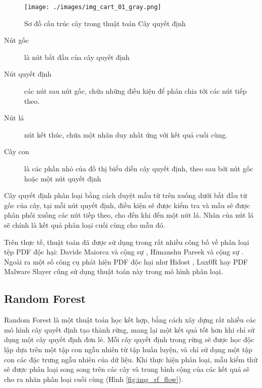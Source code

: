 \documentclass[./../main.tex]{subfiles}
\begin{document}
\begin{figure}[ht!]
	\centering
	\texttt{[image: ./images/img\_cart\_01\_gray.png]}
	\caption{Sơ đồ cấu trúc cây trong thuật toán Cây quyết định}
	\label{fig:img_cart_01_gray}
\end{figure}

\begin{description}
	\item[Nút gốc] là nút bắt đầu của cây quyết định
	\item[Nút quyết định] các nút sau nút gốc, chứa những điều kiện để phân chia tới các nút tiếp theo.
	\item[Nút lá] nút kết thúc, chứa một nhãn duy nhất ứng với kết quả cuối cùng.
	\item[Cây con] là các phần nhỏ của đồ thị biểu diễn cây quyết định, theo sau bởi nút gốc hoặc một nút quyết định
\end{description}

Cây quyết định phân loại bằng cách duyệt mẫu từ trên xuống dưới bắt đầu từ gốc của cây, tại mỗi nút quyết định, điều kiện sẽ được kiểm tra và mẫu sẽ được phân phối xuống các nút tiếp theo, cho đến khi đến một nút lá. Nhãn của nút lá sẽ chính là kết quả phân loại cuối cùng cho mẫu đó.

Trên thực tế, thuật toán đã được sử dụng trong rất nhiều công bố về phân loại tệp PDF độc hại: Davide Maiorca và cộng sự \cite{davide}, Himanshu Pareek và cộng sự \cite{himanshu}. Ngoài ra một số công cụ phát hiện PDF độc hại như Hidost \cite{hidost}, Lux0R \cite{luxor} hay PDF Malware Slayer \cite{slayer} cũng sử dụng thuật toán này trong mô hình phân loại.

\subsection{Random Forest}

Random Forest là một thuật toán học kết hợp, bằng cách xây dựng rất nhiều các mô hình cây quyết định tạo thành rừng, mang lại một kết quả tốt hơn khi chỉ sử dụng một cây quyết định đơn lẻ. Mỗi cây quyết định trong rừng sẽ được học độc lập dựa trên một tập con ngẫu nhiên từ tập huấn luyện, và chỉ sử dụng một tập con các đặc trưng ngẫu nhiên của dữ liệu. Khi thực hiện phân loại, mẫu kiểm thử sẽ được phân loại song song trên các cây và trung bình cộng của các kết quả sẽ cho ra nhãn phân loại cuối cùng (Hình \ref{fig:img_rf_flow}).
\end{document}
